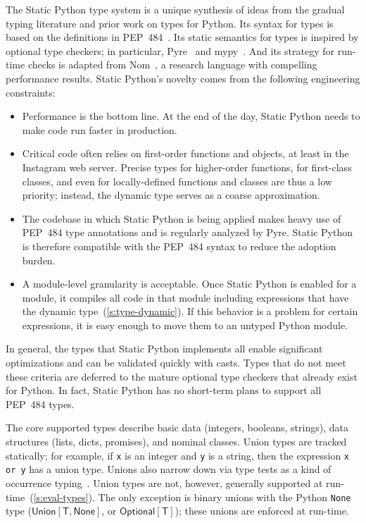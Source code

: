\documentclass[english,cleveref,submission]{programming}
\newcommand{\SP}{Static Python}
\newcommand{\PEP}{PEP~484}
\newcommand{\code}[1]{\texttt{#1}}
\newcommand{\typefont}[1]{\mathsf{#1}}
\newcommand{\paramtype}[2]{#1[#2]}
\newcommand{\sptype}{\typefont{T}}
\newcommand{\sptnone}{\typefont{None}}
\newcommand{\sptoptional}[1]{\paramtype{\typefont{Optional}}{#1}}
\newcommand{\sptunion}[1]{\paramtype{\typefont{Union}}{#1}}
\begin{document}
The \SP{} type system is a unique synthesis of ideas from the gradual typing literature
and prior work on types for Python.
Its syntax for types is based on the definitions in \PEP{}~\cite{pep484}.
Its static semantics for types is inspired by optional type checkers; in
particular, Pyre~\cite{pyre} and mypy~\cite{mypy}.
And its strategy for run-time checks is adapted from Nom~\cite{mt-oopsla-2017,mt-oopsla-2021},
a research language with compelling performance results.
\SP{}'s novelty comes from the following engineering constraints:
\begin{itemize}
  \item
    Performance is the bottom line.
    At the end of the day, \SP{} needs to make code run faster in production.
  \item
    Critical code often relies on first-order functions and objects,
    at least in the Instagram web server.
    Precise types for higher-order functions, for first-class classes, and even for
    locally-defined functions and classes are thus a low priority; instead, the
    dynamic type serves as a coarse approximation.
  \item
    The codebase in which \SP{} is being applied makes heavy use of
    \PEP{} type annotations and is regularly analyzed by Pyre.
    \SP{} is therefore compatible with the \PEP{} syntax to reduce the
    adoption burden.
  \item
    A module-level granularity is acceptable.
    Once \SP{} is enabled for a module, it compiles all code in that module
    including expressions that have the dynamic type~(\cref{s:type-dynamic}).
    If this behavior is a problem for certain expressions, it is easy enough to move
    them to an untyped Python module.
\end{itemize}
%
In general, the types that \SP{} implements all enable significant optimizations
and can be validated quickly with casts.
Types that do not meet these criteria are deferred to the mature optional
type checkers that already exist for Python.
In fact, \SP{} has no short-term plans to support all \PEP{} types.

The core supported types describe basic data (integers, booleans, strings),
data structures (lists, dicts, promises),
and nominal classes.
Union types are tracked statically; for example, if \code{x} is an integer and
\code{y} is a string, then the expression \code{x or y} has a union type.
Unions also narrow down via type tests as a kind of occurrence
typing~\cite{tf-icfp-2010,gsk-esop-2011}.
Union types are not, however, generally supported at run-time~(\cref{s:eval-types}).
The only exception is binary unions with the Python \code{None}
type ($\sptunion{\sptype, \sptnone}$, or
$\sptoptional{\sptype}$); these unions are enforced at run-time.
\end{document}
